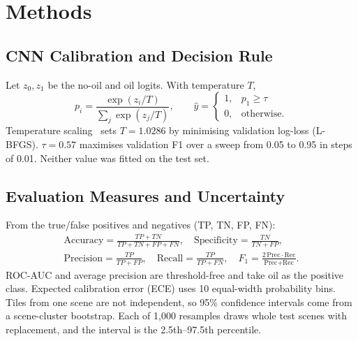\documentclass[conference]{IEEEtran}
\begin{document}
\section{Methods}

\subsection{CNN Calibration and Decision Rule}
Let $z_0,z_1$ be the no-oil and oil logits. With temperature $T$,
\begin{equation}
p_i=\frac{\exp(z_i/T)}{\sum_{j}\exp(z_j/T)},\qquad
\hat y=\begin{cases}1,& p_1\ge\tau\\0,&\text{otherwise.}\end{cases}
\end{equation}
Temperature scaling~\cite{guo2017} sets $T=1.0286$ by minimising validation
log-loss (L-BFGS). $\tau=0.57$ maximises validation F1
over a sweep from 0.05 to 0.95 in steps of 0.01. Neither value was fitted on the test set.

\subsection{Evaluation Measures and Uncertainty}
From the true/false positives and negatives (TP, TN, FP, FN):
\begin{gather}
\text{Accuracy}=\tfrac{TP+TN}{TP+TN+FP+FN},\quad
\text{Specificity}=\tfrac{TN}{TN+FP},\\
\text{Precision}=\tfrac{TP}{TP+FP},\quad
\text{Recall}=\tfrac{TP}{TP+FN},\quad
F_1=\tfrac{2\,\text{Prec}\cdot\text{Rec}}{\text{Prec}+\text{Rec}}.
\end{gather}
ROC-AUC and average precision are threshold-free and take oil as the positive class.
Expected calibration error (ECE) uses 10 equal-width probability bins. Tiles from one
scene are not independent, so 95\% confidence intervals come from a scene-cluster
bootstrap. Each of 1,000 resamples draws whole test scenes with replacement, and the
interval is the 2.5th--97.5th percentile.
\end{document}
